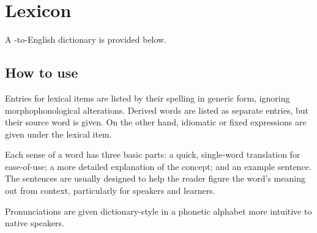 
\makeatother

\setchapterpreamble[u]{\margintoc}
\chapter{Lexicon}
A \langname{}-to-English dictionary is provided below.

\section*{How to use}
Entries for lexical items are listed by their spelling in generic form, ignoring morphophonological alterations. Derived words are listed as separate entries, but their source word is given. On the other hand, idiomatic or fixed expressions are given under the lexical item.

Each sense of a word has three basic parts: a quick, single-word translation for ease-of-use; a more detailed explanation of the concept; and an example sentence. The sentences are usually designed to help the reader figure the word's meaning out from context, particularly for \langname{} speakers and learners.

Pronunciations are given dictionary-style in a phonetic alphabet more intuitive to native \langname{} speakers.

